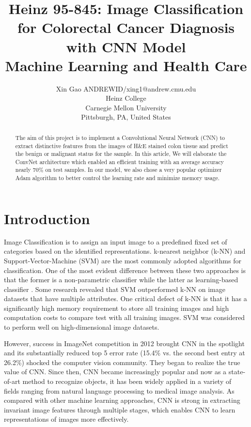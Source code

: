 \documentclass[twoside,11pt]{article}
\begin{document}
\title{Heinz 95-845: Image Classification for Colorectal Cancer Diagnosis with CNN Model \\Machine Learning and Health Care}

\author{\name Xin Gao \email ANDREWID/xing1@andrew.cmu.edu \\
       \addr Heinz College\\
       Carnegie Mellon University\\
       Pittsburgh, PA, United States} 

\maketitle

\begin{abstract}

The aim of this project is to implement a Convolutional Neural Network (CNN) to extract distinctive features from the images of H&E stained colon tissue and predict the benign or malignant status for the sample. In this article, We will elaborate the ConvNet architecture which enabled an efficient training with an average accuracy nearly 70\% on test samples. In our model, we also chose a very popular optimizer Adam algorithm to better control the learning rate and minimize memory usage. 
 
\end{abstract}

\section{Introduction}
Image Classification is to assign an input image to a predefined fixed set of categories based on the identified representations. k-nearest neighbor (k-NN) and Support-Vector-Machine (SVM) are the most commonly adopted algorithms for classification. One of the most evident difference between these two approaches is that the former is a non-parametric classifier while the latter as learning-based classifier \citep{1}. Some research \citep{2}revealed that SVM outperformed k-NN on image datasets that have multiple attributes. One critical defect of k-NN is that it has a significantly high memory requirement to store all training images and high computation costs to compare test with all training images. SVM was considered to perform well on high-dimensional image datasets.

However, success in ImageNet competition in 2012 brought CNN in the spotlight and its substantially reduced top 5 error rate (15.4\% vs. the second best entry at 26.2\%) \citep{3}shocked the computer vision community. They began to realize the true value of CNN. Since then, CNN became increasingly popular and now as a state-of-art method to recognize objects, it has been widely applied in a variety of fields ranging from natural language processing to medical image analysis. As compared with other machine learning approaches, CNN is strong in extracting invariant image features through multiple stages, which enables CNN to learn representations of images more effectively.  
\end{document}

